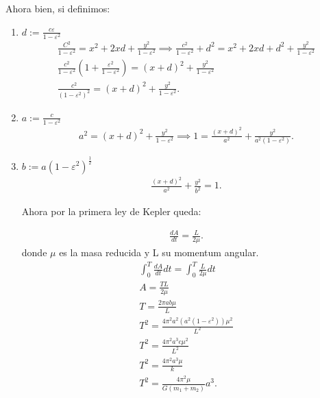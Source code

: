 \documentclass{report}
\begin{document}
Ahora bien, si definimos:
\begin{enumerate}
  \item $d:= \frac{c\varepsilon}{1-\varepsilon^2}$ 
    \begin{align*}
      \frac{C^2}{1-\varepsilon^2} = x^2 + 2xd + \frac{y^2}{1-\varepsilon^2} \implies \frac{c^2}{1-\varepsilon^2}+d^2 = x^2 + 2xd + d^2 + \frac{y^2}{1-\varepsilon^2}\\
      \frac{c^2}{1-\varepsilon^2}\left( 1 + \frac{\varepsilon^2}{1-\varepsilon^2} \right) = \left( x+d \right)^2 + \frac{y^2}{1-\varepsilon^2}\\
      \frac{c^2}{\left( 1-\varepsilon^2 \right)^2}=\left( x+d \right)^2 + \frac{y^2}{1-\varepsilon^2}
    .\end{align*}

  \item $a := \frac{c}{1-\varepsilon^2}$ 
   \begin{align*}
     a^2 = \left( x + d \right) ^2 + \frac{y^2}{1-\varepsilon^2} \implies 1 = \frac{\left( x+d \right) ^2}{a^2}+\frac{y^2}{a^2\left( 1-\varepsilon^2 \right) }
   .\end{align*} 

 \item $b := a \left( 1-\varepsilon^2 \right)^{\frac{1}{2}}$ 
   \begin{align*}
     \frac{\left( x+d \right)^2}{a^2} + \frac{y^2}{b^2} = 1
   .\end{align*}

   Ahora por la primera ley de Kepler queda:
   
   \begin{align*}
     \frac{dA}{dt} = \frac{L}{2\mu}
   .\end{align*} donde $\mu$ es la masa reducida y L su momentum angular.
   \begin{align*}
     \int_{0}^{T}\frac{dA}{dt}dt = \int_{0}^{T}\frac{L}{2\mu}dt\\
     A = \frac{TL}{2\mu}\\
     T = \frac{2\pi a b \mu}{L}\\
     T^2 = \frac{4\pi^2 a^2\left( a^2\left( 1 - \varepsilon^2 \right)  \right) \mu^2}{L^2}\\
     T^2 = \frac{4\pi^2a^3c\mu^2}{L^2}\\
     T^2 = \frac{4\pi^2a^{3}\mu}{k}\\
     T^2 = \frac{4\pi^2\mu}{G\left( m_1+m_2 \right) }a^{3}
   .\end{align*} 


\end{enumerate}
\end{document}
